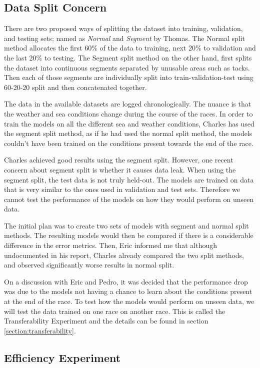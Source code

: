 \documentclass[12pt,twoside]{report}
\begin{document}
\subsection{Data Split Concern}

There are two proposed ways of splitting the dataset into training, validation, and testing sets; named as \emph{Normal} and \emph{Segment} by Thomas. The Normal split method allocates the first 60\% of the data to training, next 20\% to validation and the last 20\% to testing. The Segment split method on the other hand, first splits the dataset into continuous segments separated by unusable areas such as tacks. Then each of those segments are individually split into train-validation-test using 60-20-20 split and then concatenated together.

The data in the available datasets are logged chronologically. The nuance is that the weather and sea conditions change during the course of the races. In order to train the models on all the different sea and weather conditions, Charles has used the segment split method, as if he had used the normal split method, the models couldn't have been trained on the conditions present towards the end of the race.

Charles achieved good results using the segment split. However, one recent concern about segment split is whether it causes data leak. When using the segment split, the test data is not truly held-out. The models are trained on data that is very similar to the ones used in validation and test sets. Therefore we cannot test the performance of the models on how they would perform on unseen data.

The initial plan was to create two sets of models with segment and normal split methods. The resulting models would then be compared if there is a considerable difference in the error metrics. Then, Eric informed me that although undocumented in his report, Charles already compared the two split methods, and observed significantly worse results in normal split.

On a discussion with Eric and Pedro, it was decided that the performance drop was due to the models not having a chance to learn about the conditions present at the end of the race. To test how the models would perform on unseen data, we will test the data trained on one race on another race. This is called the Transferability Experiment and the details can be found in section \ref{section:transferability}.

\subsection{Efficiency Experiment}
\end{document}
